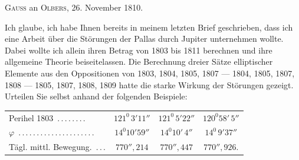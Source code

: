 \par\bigskip
{}
\begin{center}
\textsc{Gauss} an \textsc{Olbers}, 26. November 1810.
\end{center}
\noindent\hspace*{\parindent}Ich glaube, ich habe Ihnen bereits in meinem letzten Brief geschrieben, dass ich eine Arbeit\HistoricalNoteEight{Vgl. S. 473 dieses Bandes.]} über die Störungen der Pallas durch Jupiter unternehmen wollte. Dabei wollte ich allein ihren Betrag von 1803 bis 1811 berechnen und ihre allgemeine Theorie beiseitelassen. Die Berechnung dreier Sätze elliptischer Elemente aus den Oppositionen von 1803, 1804, 1805, 1807 — 1804, 1805, 1807, 1808 — 1805, 1807, 1808, 1809 hatte die starke Wirkung der Störungen gezeigt. Urteilen Sie selbst anhand der folgenden Beispiele:
\begin{center}
\begingroup\footnotesize\setlength{\tabcolsep}{3pt}\renewcommand{\arraystretch}{1.2}
\begin{tabular}{lccc}
Perihel 1803\ .\,.\,.\,.\,.\,.\,.\,. & \(121^{0}\,3'11''\) & \(121^{0}\,5'22''\) & \(120^{0}58'\,5''\)\\
\(\varphi\)\ .\,.\,.\,.\,.\,.\,.\,.\,.\,.\,.\,.\,.\,.\,.\,.\,.\,.\,.\,.\,. & \(14^{0}10'59''\) & \(14^{0}10'\,4''\) & \(14^{0}\,9'37''\)\\
Tägl. mittl. Bewegung.\ .\,.\,. & \(770''{,}214\) & \(770''{,}447\) & \(770''{,}926.\)\\
\end{tabular}\endgroup
\end{center}
\par
